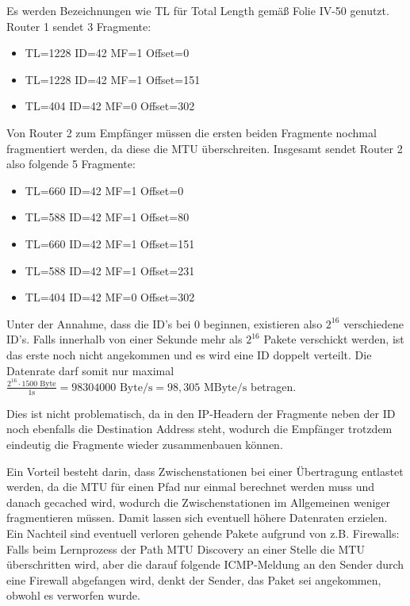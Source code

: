 \documentclass{../exercisesheet}
\begin{document}
\begin{exercise}{6}
\begin{subexercise}
Es werden Bezeichnungen wie TL für Total Length gemäß Folie IV-50 genutzt.\\
	Router 1 sendet 3 Fragmente:
	\begin{itemize}
	\item TL=1228 ID=42 MF=1 Offset=0
	\item TL=1228 ID=42 MF=1 Offset=151
	\item TL=404 ID=42 MF=0 Offset=302
	\end{itemize}
	Von Router 2 zum Empfänger müssen die ersten beiden Fragmente nochmal fragmentiert werden, da diese die MTU überschreiten. Insgesamt sendet Router 2 also folgende
	5 Fragmente:
	\begin{itemize}
	\item TL=660 ID=42 MF=1 Offset=0
	\item TL=588 ID=42 MF=1 Offset=80
	\item TL=660 ID=42 MF=1 Offset=151
	\item TL=588 ID=42 MF=1 Offset=231
	\item TL=404 ID=42 MF=0 Offset=302
	\end{itemize}
\end{subexercise}
\begin{subexercise}
Unter der Annahme, dass die ID's bei 0 beginnen, existieren also $2^{16}$ verschiedene ID's. Falls innerhalb von einer Sekunde mehr als $2^{16}$ Pakete verschickt werden, ist das erste
noch nicht angekommen und es wird eine ID doppelt verteilt. Die Datenrate darf somit nur maximal $\frac{2^{16} \cdot 1500 \text{ Byte}}{1\text{s}}= 
98304000 \text{ Byte/s}= 98,305 \text{ MByte/s}$ betragen.
\end{subexercise}
\begin{subexercise}
Dies ist nicht problematisch, da in den IP-Headern der Fragmente neben der ID noch ebenfalls die Destination Address steht, wodurch die Empfänger trotzdem eindeutig die Fragmente
wieder zusammenbauen können.
\end{subexercise}
\begin{subexercise}
Ein Vorteil besteht darin, dass Zwischenstationen bei einer Übertragung entlastet werden, da die MTU für einen Pfad nur einmal berechnet werden muss und danach gecached wird, 
wodurch die Zwischenstationen im Allgemeinen weniger fragmentieren müssen. Damit lassen sich eventuell höhere Datenraten erzielen.\\
Ein Nachteil sind eventuell verloren gehende Pakete aufgrund von z.B. Firewalls: Falls beim Lernprozess der Path MTU Discovery an einer Stelle die MTU überschritten wird, aber
die darauf folgende ICMP-Meldung an den Sender durch eine Firewall abgefangen wird, denkt der Sender, das Paket sei angekommen, obwohl es verworfen wurde.
\end{subexercise}
\end{exercise}
\end{document}
